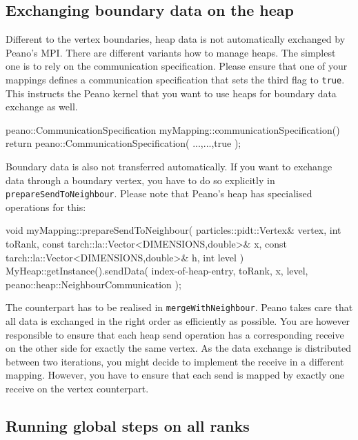 \subsection{Exchanging boundary data on the heap}

Different to the vertex boundaries, heap data is not automatically exchanged by
Peano's MPI. 
There are different variants how to manage heaps. 
The simplest one is to rely on the communication specification. 
Please ensure that one of your mappings defines a communication specification
that sets the third flag to \texttt{true}.
This instructs the Peano kernel that you want to use heaps for boundary data
exchange as well.
\begin{code}
peano::CommunicationSpecification  
myMapping::communicationSpecification() { 
  return peano::CommunicationSpecification( ...,...,true );
}
\end{code}

\noindent
Boundary data is also not transferred automatically. 
If you want to exchange data through a boundary vertex, you have to do so
explicitly in \texttt{prepareSendToNeighbour}.
Please note that Peano's heap has specialised operations for this:
\begin{code}
void myMapping::prepareSendToNeighbour(
  particles::pidt::Vertex&                      vertex,
  int                                           toRank,
  const tarch::la::Vector<DIMENSIONS,double>&   x,
  const tarch::la::Vector<DIMENSIONS,double>&   h,
  int                                           level
) {
  MyHeap::getInstance().sendData(
    index-of-heap-entry,
    toRank,
    x,
    level,
    peano::heap::NeighbourCommunication
  );
}
\end{code}

\noindent
The counterpart has to be realised in \texttt{mergeWithNeighbour}.
Peano takes care that all data is exchanged in the right order as efficiently as
possible.
You are however responsible to ensure that each heap send operation has a
corresponding receive on the other side for exactly the same vertex.
As the data exchange is distributed between two iterations, you might decide to
implement the receive in a different mapping.
However, you have to ensure that each send is mapped by exactly one receive on
the vertex counterpart.

\subsection{Running global steps on all ranks}

